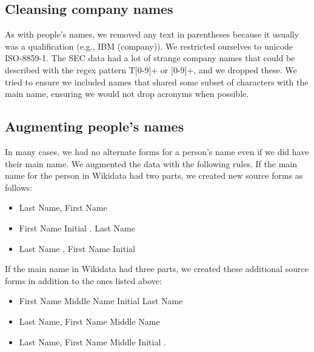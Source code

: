 \subsection{Cleansing company names}
As with people's names, we removed any text in parentheses because it usually was a qualification (e.g., IBM (company)).  We restricted ourselves to unicode ISO-8859-1.  The SEC data had a lot of strange company names that could be described with the regex pattern T[0-9]+ or [0-9]+, and we dropped these.  We tried to ensure we included names that shared some subset of characters with the main name, ensuring we would not drop acronyms when possible.

\subsection{Augmenting people's names}
In many cases, we had no alternate forms for a person's name even if we did have their main name.  We augmented the data with the following rules.  If the main name for the person in Wikidata had two parts, we created new source forms as follows: 
\begin{itemize}
\item Last Name, First Name
\item First Name Initial . Last Name
\item Last Name , First Name Initial
\end{itemize}
If the main name in Wikidata had three parts, we created these additional source forms in addition to the ones listed above:
\begin{itemize}
\item First Name Middle Name Initial Last Name
\item Last Name, First Name Middle Name
\item Last Name, First Name Middle Initial .
\end{itemize}
   
